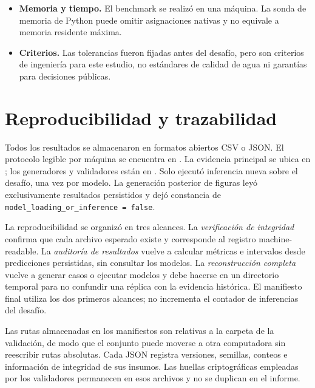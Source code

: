 \documentclass[11pt,a4paper]{article}
\newcommand{\code}[1]{\texttt{#1}}
\begin{document}
\begin{itemize}
    instantánea. Los mayores errores neuronales aparecen precisamente junto al
    encendido y la primera celda interior; otras formas de fuente podrían
    cambiar la distribución del error.
    \item \textbf{Memoria y tiempo.} El benchmark se realizó en una máquina. La
    sonda de memoria de Python puede omitir asignaciones nativas y no equivale a
    memoria residente máxima.
    \item \textbf{Criterios.} Las tolerancias fueron fijadas antes del desafío,
    pero son criterios de ingeniería para este estudio, no estándares de
    calidad de agua ni garantías para decisiones públicas.
\end{itemize}

\section{Reproducibilidad y trazabilidad}

Todos los resultados se almacenaron en formatos abiertos CSV o JSON. El
protocolo legible por máquina se encuentra en
. La evidencia principal se ubica en
; los generadores y validadores están en . Solo
 ejecutó inferencia nueva sobre el
desafío, una vez por modelo. La generación posterior de figuras leyó
exclusivamente resultados persistidos y dejó constancia de
\code{model\_loading\_or\_inference = false}.

La reproducibilidad se organizó en tres alcances. La \emph{verificación de
integridad} confirma que cada archivo esperado existe y corresponde al registro
machine-readable. La
\emph{auditoría de resultados} vuelve a calcular métricas e intervalos desde
predicciones persistidas, sin consultar los modelos. La \emph{reconstrucción
completa} vuelve a generar casos o ejecutar modelos y debe hacerse en un
directorio temporal para no confundir una réplica con la evidencia histórica.
El manifiesto final utiliza los dos primeros alcances; no incrementa el contador
de inferencias del desafío.

Las rutas almacenadas en los manifiestos son relativas a la carpeta de la
validación, de modo que el conjunto puede moverse a otra computadora sin
reescribir rutas absolutas. Cada JSON registra versiones, semillas, conteos e
información de integridad de sus insumos. Las huellas criptográficas empleadas
por los validadores permanecen en esos archivos y no se duplican en el informe.
\end{document}
